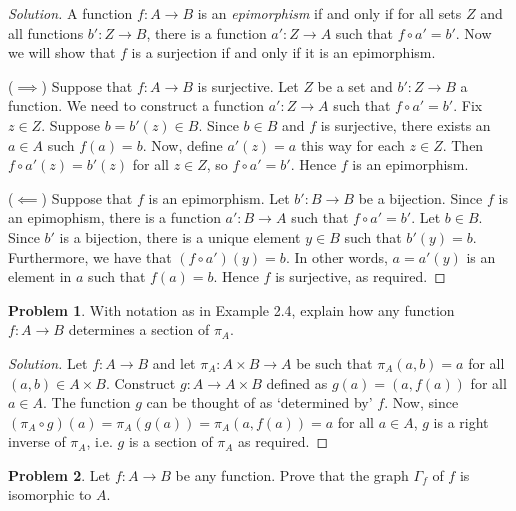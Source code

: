 \documentclass[fontsize=14pt]{scrartcl}
\theoremstyle{definition}
\newtheorem{problem-internal}{Problem}[subsection]
\newenvironment{problem}{
  \medskip
  \begin{problem-internal}
}{
  \end{problem-internal}
}
\newenvironment{solution}{
  \begin{proof}[Solution]
  \vspace{-8px}
  \setlength{\parskip}{4px}
  \setlength{\parindent}{0px}
}{
  \end{proof}
}
\begin{document}
\begin{solution}
A function $f:A\to B$ is an \textit{epimorphism} if and only if for all sets $Z$
and all functions $b':Z\to B$, there is a function $a':Z\to A$ such that $f\circ
a' = b'$. Now we will show that $f$ is a surjection if and only if it is an
epimorphism.

($\implies$) Suppose that $f:A\to B$ is surjective. Let $Z$ be a set and
$b':Z\to B$ a function. We need to construct a function $a':Z\to A$ such that
$f\circ a' = b'$. Fix $z\in Z$. Suppose $b=b'(z)\in B$. Since $b\in B$ and $f$
is surjective, there exists an $a\in A$ such $f(a) = b$. Now, define $a'(z) =
a$ this way for each $z\in Z$. Then $f\circ a'(z) = b'(z)$ for all $z\in Z$, so
$f\circ a' = b'$. Hence $f$ is an epimorphism.

($\impliedby$) Suppose that $f$ is an epimorphism. Let $b':B\to B$ be a
bijection. Since $f$ is an epimophism, there is a function $a':B\to A$ such that
$f\circ a' = b'$. Let $b\in B$. Since $b'$ is a bijection, there is a unique
element $y\in B$ such that $b'(y) = b$. Furthermore, we have that $(f\circ
a')(y) = b$. In other words, $a = a'(y)$ is an element in $a$ such that $f(a) =
b$. Hence $f$ is surjective, as required.
\end{solution}


\begin{problem}
With notation as in Example 2.4, explain how any function $f:A\to B$ determines
a section of $\pi_A$.
\end{problem}

\begin{solution}
Let $f:A\to B$ and let $\pi_A:A\times B\to A$ be such that $\pi_A(a,b) = a$ for
all $(a,b)\in A\times B$. Construct $g:A\to A\times B$ defined as $g(a) = (a,
f(a))$ for all $a\in A$. The function $g$ can be thought of as `determined by'
$f$. Now, since $(\pi_A\circ g)(a) = \pi_A(g(a)) = \pi_A(a, f(a)) = a$ for all
$a\in A$, $g$ is a right inverse of $\pi_A$, i.e. $g$ is a section of $\pi_A$ as
required.
\end{solution}


\begin{problem}
Let $f:A\to B$ be any function. Prove that the graph $\Gamma_f$ of $f$ is
isomorphic to $A$.
\end{problem}
\end{document}
